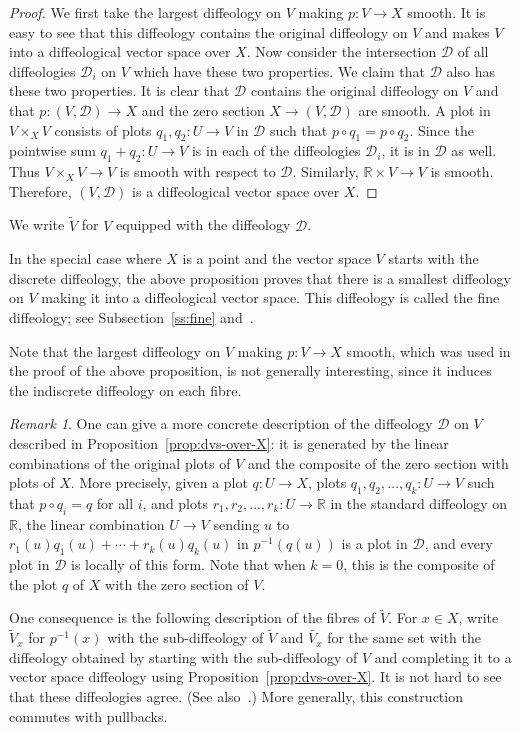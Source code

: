 \documentclass{amsart}
\theoremstyle{remark}
\newtheorem{rem}[de]{Remark}
\newcommand{\ra}{\to}
\newcommand{\cD}{{\mathcal{D}}}
\def \R{\mathbb{R}}
\begin{document}
\begin{proof}
We first take the largest diffeology on $V$ making $p: V \to X$ smooth.
It is easy to see that this diffeology contains the original diffeology on $V$
and makes $V$ into a diffeological vector space over $X$.
Now consider the intersection $\cD$ of all diffeologies $\cD_i$ on $V$ which
have these two properties.
We claim that $\cD$ also has these two properties.
It is clear that $\cD$ contains the original diffeology on $V$
and that $p:(V,\cD) \ra X$ and the zero section $X \ra (V,\cD)$ are smooth.
A plot in $V \times_X V$ consists of plots $q_1, q_2 : U \to V$ in $\cD$ such that
$p \circ q_1 = p \circ q_2$.
Since the pointwise sum $q_1+q_2 : U \to V$ is in each of
the diffeologies $\cD_i$, it is in $\cD$ as well.
Thus $V \times_X V \to V$ is smooth with respect to $\cD$.
Similarly, $\R \times V \to V$ is smooth.
Therefore, $(V,\cD)$ is a diffeological vector space over $X$.
\end{proof}

We write $\tilde{V}$ for $V$ equipped with the diffeology $\cD$.

In the special case where $X$ is a point and the vector space $V$ starts with the
discrete diffeology, the above proposition proves that there is a smallest
diffeology on $V$ making it into a diffeological vector space.
This diffeology is called the fine diffeology;
see Subsection~\ref{ss:fine} and~\cite[Chapter~3]{I3}.

Note that the largest diffeology on $V$ making $p: V \to X$ smooth, which
was used in the proof of the above proposition, is not
generally interesting, since it induces the indiscrete diffeology on each fibre.

\begin{rem}\label{rem:alt-description}
One can give a more concrete description of the diffeology $\cD$ on $V$
described in Proposition~\ref{prop:dvs-over-X}:
it is generated by the linear combinations of the original plots of $V$
and the composite of the zero section with plots of $X$.
More precisely, given a plot $q : U \to X$,
plots $q_1, q_2, \ldots, q_k : U \to V$
such that $p \circ q_i = q$ for all $i$,
and plots $r_1, r_2, \ldots, r_k: U \to \R$ in the standard diffeology on $\R$,
the linear combination $U \to V$ sending $u$ to $r_1(u) q_1(u) + \cdots + r_k(u) q_k(u)$
in $p^{-1}(q(u))$ is a plot in $\cD$, and every plot in $\cD$ is locally of this form.
Note that when $k=0$, this is the composite of the plot $q$ of $X$
with the zero section of $V$.

One consequence is the following description of the fibres of $\tilde{V}$.
For $x \in X$, write $\tilde{V}_x$ for $p^{-1}(x)$ with the sub-diffeology of $\tilde{V}$
and $\widetilde{V_x}$ for the same set with the diffeology obtained by
starting with the sub-diffeology of $V$ and completing it to a vector space
diffeology using Proposition~\ref{prop:dvs-over-X}.
It is not hard to see that these diffeologies agree.
(See also~\cite[Proposition~6.2.2(iiii)]{V}.)
More generally, this construction commutes with pullbacks.
\end{rem}
\end{document}
